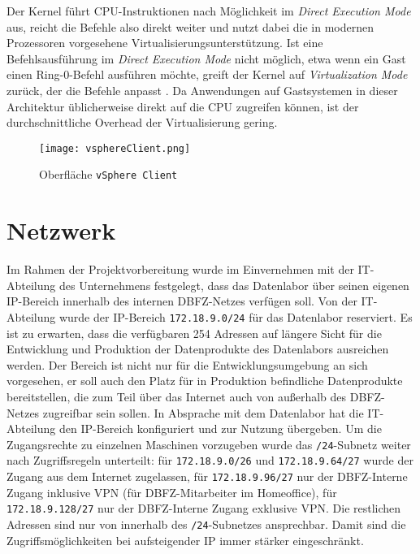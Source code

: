 Der Kernel führt CPU-Instruktionen nach Möglichkeit im \textit{Direct Execution Mode} aus, reicht die Befehle also direkt weiter und nutzt dabei die in modernen Prozessoren vorgesehene Virtualisierungsunterstützung.
Ist eine Befehlsausführung im \textit{Direct Execution Mode} nicht möglich, etwa wenn ein Gast einen Ring-0-Befehl ausführen möchte, greift der Kernel auf \textit{Virtualization Mode} zurück, der die Befehle anpasst \cite[57-59]{woehrmannvsphere2018}.
Da Anwendungen auf Gastsystemen in dieser Architektur üblicherweise direkt auf die CPU zugreifen können, ist der durchschnittliche Overhead der Virtualisierung gering.
\begin{figure}[h!]
\texttt{[image: vsphereClient.png]}
\caption{Oberfläche \texttt{vSphere Client}}
\label{vSpherePic}
\end{figure}

\section{Netzwerk}
  Im Rahmen der Projektvorbereitung wurde im Einvernehmen mit der IT-Abteilung des Unternehmens festgelegt, dass das Datenlabor über seinen eigenen \acs{IP}-Bereich innerhalb des internen DBFZ-Netzes verfügen soll.
  Von der IT-Abteilung wurde der IP-Bereich \texttt{172.18.9.0/24} für das Datenlabor reserviert.
  Es ist zu erwarten, dass die verfügbaren 254 Adressen auf längere Sicht für die Entwicklung und Produktion der Datenprodukte des Datenlabors ausreichen werden.
  Der Bereich ist nicht nur für die Entwicklungsumgebung an sich vorgesehen,
  er soll auch den Platz für in Produktion befindliche Datenprodukte bereitstellen,
  die zum Teil über das Internet auch von außerhalb des DBFZ-Netzes zugreifbar sein sollen.
  In Absprache mit dem Datenlabor hat die IT-Abteilung den IP-Bereich konfiguriert und zur Nutzung übergeben.
  Um die Zugangsrechte zu einzelnen Maschinen vorzugeben wurde das \texttt{/24}-Subnetz weiter nach Zugriffsregeln unterteilt:
  für \texttt{172.18.9.0/26} und \texttt{172.18.9.64/27} wurde der Zugang aus dem Internet zugelassen,
  für \texttt{172.18.9.96/27} nur der DBFZ-Interne Zugang inklusive \acs{VPN} (für DBFZ-Mitarbeiter im Homeoffice),
  für \texttt{172.18.9.128/27} nur der DBFZ-Interne Zugang exklusive VPN.
  Die restlichen Adressen sind nur von innerhalb des \texttt{/24}-Subnetzes ansprechbar.
  Damit sind die Zugriffsmöglichkeiten bei aufsteigender IP immer stärker eingeschränkt.

